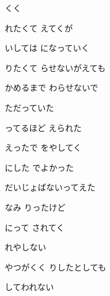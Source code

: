 \documentclass[a4paper,tate,twocolumn,12pt]{ltjtarticle}
\begin{document}
\thispagestyle{empty}

\begin{center}
{\LARGE {}くく}
\end{center}

\vspace{1em}

\begin{flushleft}

\noindent\begin{minipage}{\linewidth}
れたくて えてくが

いしては になっていく

りたくて らせないがえても

かめるまで わらせないで
\end{minipage}

\vspace{2em}

\noindent\begin{minipage}{\linewidth}
ただっていた

ってるほど えられた

えったで をやしてく
\end{minipage}

\vspace{2em}

\noindent\begin{minipage}{\linewidth}
にした でよかった

だいじょばないってえた

なみ りったけど

にって されてく
\end{minipage}

\vspace{2em}

\noindent\begin{minipage}{\linewidth}
れやしない

やつがくく りしたとしても

してわれない


\end{minipage}
\end{flushleft}
\end{document}
